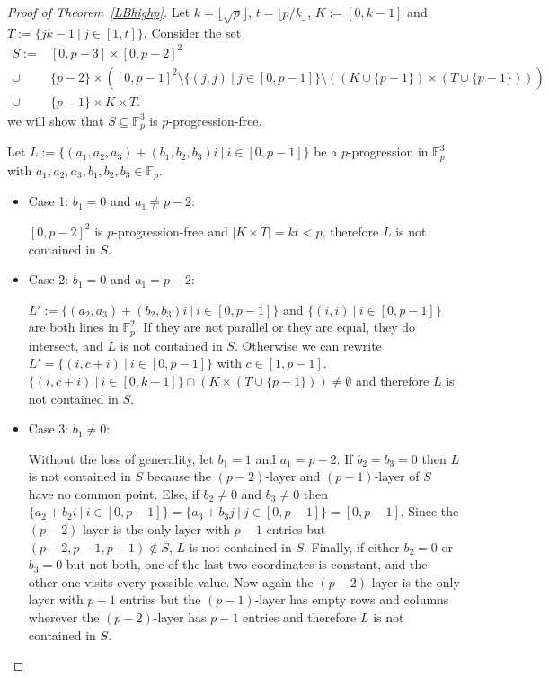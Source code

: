 \documentclass[12pt]{amsart}
\newcommand{\<}{\langle}
\renewcommand{\>}{\rangle}
\numberwithin{equation}{section}
\numberwithin{theorem}{section}
\begin{document}
\begin{proof}[Proof of Theorem~\ref{LBhighp}]

Let $k=\lfloor \sqrt{p} \rfloor$, $t=\lfloor p/k \rfloor$, $K:=[0,k-1]$ and $T:=\{jk-1\ |\ j\in [1,t]\}$. Consider the set 
\begin{equation*}
\begin{split}   
S:=&[0,p-3]\times [0,p-2]^2 \\ 
\cup &\{p-2\} \times ([0,p-1]^2 \setminus \{(j,j)\ |\ j\in [0,p-1]\}\setminus ((K\cup \{p-1\})\times (T\cup \{p-1\}))   )\\ 
 \cup  & \{p-1\}\times K\times T.
\end{split}
\end{equation*}
we will show that $S\subseteq \mathbb{F}_p^3$ is $p$-progression-free.

Let  $L:=\{(a_1,a_2,a_3)+(b_1,b_2,b_3)i \ |\  i\in [0,p-1]\}$ be a $p$-progression in $\mathbb{F}_p^3$ with $a_1,a_2,a_3,b_1,b_2,b_3\in\mathbb{F}_p$.
\begin{itemize}

\item Case 1: $b_1=0$ and $a_1\neq p-2:$

\noindent
$[0,p-2]^2$ is $p$-progression-free and $|K\times T|=kt<p$, therefore $L$ is not contained in $S$.

\smallskip
\item Case 2: $b_1=0$ and $a_1= p-2:$

\noindent
$L':=\{(a_2,a_3)+(b_2,b_3)i\ |\ i\in [0,p-1]\}$ and $\{(i,i)\ |\ i \in [0,p-1]\}$ are both lines in $\mathbb{F}_p^2$. If they are not parallel or they are equal, they do intersect, and $L$ is not contained in $S$. Otherwise we can rewrite $L'=\{(i,c+i)\ |\ i\in [0,p-1]\}$ with $c\in [1,p-1].$ $\{(i,c+i)\ |\ i\in [0,k-1]\}\cap (K\times (T\cup \{p-1\}))\neq \emptyset$ and therefore $L$ is not contained in $S$.

\smallskip
\item Case 3: $b_1\neq 0$:

\noindent
Without the loss of generality, let $b_1=1$ and $a_1=p-2$. If $b_2=b_3=0$ then $L$ is not contained in $S$ because  the $(p-2)$-layer and $(p-1)$-layer of $S$ have no common point.
Else, if $b_2\neq 0$ and $b_3 \neq 0$ then $\{a_2+b_2i\ |\ i\in [0,p-1]\}=\{a_3+b_3j\ |\ j\in [0,p-1]\}=[0,p-1].$ Since the $(p-2)$-layer is the only layer with $p-1$ entries but $(p-2,p-1,p-1)\not\in S$, $L$ is not contained in $S$.
Finally, if either $b_2=0$ or $b_3=0$ but not both, one of the last two coordinates is constant, and the other one visits every possible value. Now again the  $(p-2)$-layer is the only layer with $p-1$ entries but the $(p-1)$-layer has empty rows and columns wherever the $(p-2)$-layer has $p-1$ entries and therefore $L$ is not contained in $S$.


\end{itemize}
\end{proof}
\end{document}
